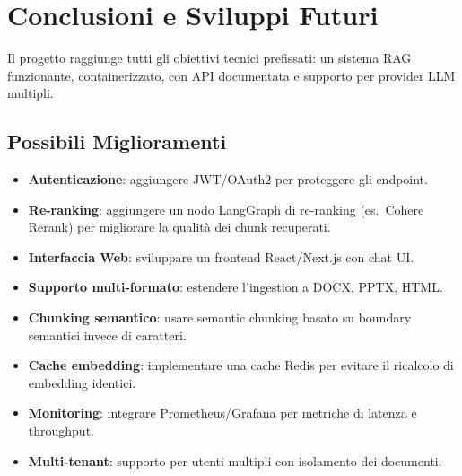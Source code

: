 \section{Conclusioni e Sviluppi Futuri}

Il progetto raggiunge tutti gli obiettivi tecnici prefissati: un sistema RAG funzionante,
containerizzato, con API documentata e supporto per provider LLM multipli.

\subsection{Possibili Miglioramenti}

\begin{itemize}
  \item \textbf{Autenticazione}: aggiungere JWT/OAuth2 per proteggere gli endpoint.
  \item \textbf{Re-ranking}: aggiungere un nodo LangGraph di re-ranking (es.\ Cohere
        Rerank) per migliorare la qualità dei chunk recuperati.
  \item \textbf{Interfaccia Web}: sviluppare un frontend React/Next.js con chat UI.
  \item \textbf{Supporto multi-formato}: estendere l'ingestion a DOCX, PPTX, HTML.
  \item \textbf{Chunking semantico}: usare semantic chunking basato su boundary
        semantici invece di caratteri.
  \item \textbf{Cache embedding}: implementare una cache Redis per evitare il ricalcolo
        di embedding identici.
  \item \textbf{Monitoring}: integrare Prometheus/Grafana per metriche di latenza e
        throughput.
  \item \textbf{Multi-tenant}: supporto per utenti multipli con isolamento dei documenti.
\end{itemize}
